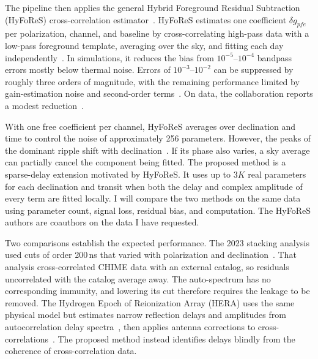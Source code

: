 \documentclass[12pt]{article}
\begin{document}
The pipeline then applies the general Hybrid Foreground Residual Subtraction (HyFoReS) cross-correlation estimator~\cite[Sec.~III.A; Eqs.~(5), (9), (11), pp.~3--4]{hyfores}. HyFoReS estimates one coefficient $\delta g_{pfe}$ per polarization, channel, and baseline by cross-correlating high-pass data with a low-pass foreground template, averaging over the sky, and fitting each day independently~\cite[Sec.~3.3; Eq.~(23)]{chime2025auto}. In simulations, it reduces the bias from $10^{-5}$--$10^{-4}$ bandpass errors mostly below thermal noise. Errors of $10^{-3}$--$10^{-2}$ can be suppressed by roughly three orders of magnitude, with the remaining performance limited by gain-estimation noise and second-order terms~\cite[Secs.~IV.A--IV.B; Figs.~2 and 4, pp.~8--11; Sec.~V.B, p.~14]{hyfores_sim}. On data, the collaboration reports a modest reduction~\cite[Sec.~3.3; Eq.~(24); Fig.~3]{chime2025auto}.

With one free coefficient per channel, HyFoReS averages over declination and time to control the noise of approximately 256 parameters. However, the peaks of the dominant ripple shift with declination~\cite[Sec.~V; Fig.~5]{chime2024holo}. If its phase also varies, a sky average can partially cancel the component being fitted. The proposed method is a sparse-delay extension motivated by HyFoReS. It uses up to $3K$ real parameters for each declination and transit when both the delay and complex amplitude of every term are fitted locally. I will compare the two methods on the same data using parameter count, signal loss, residual bias, and computation. The HyFoReS authors are coauthors on the data I have requested.

Two comparisons establish the expected performance. The 2023 stacking analysis used cuts of order 200\,ns that varied with polarization and declination~\cite[Sec.~IV.5; Eqs.~(53)--(57); Fig.~9; Sec.~V.1, Fig.~13]{chime2023}. That analysis cross-correlated CHIME data with an external catalog, so residuals uncorrelated with the catalog average away. The auto-spectrum has no corresponding immunity, and lowering its cut therefore requires the leakage to be removed. The Hydrogen Epoch of Reionization Array (HERA) uses the same physical model but estimates narrow reflection delays and amplitudes from autocorrelation delay spectra~\cite[Sec.~3.1; Fig.~3, pp.~7--8]{kern2019}, then applies antenna corrections to cross-correlations~\cite[Sec.~3; Fig.~5, pp.~5--8]{kern2020}. The proposed method instead identifies delays blindly from the coherence of cross-correlation data.
\end{document}
